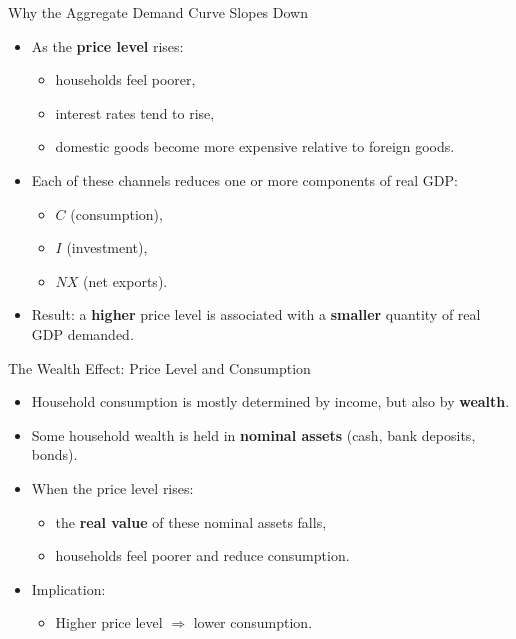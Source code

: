 \documentclass[aspectratio=169]{beamer}
\begin{document}

\begin{frame}{Why the Aggregate Demand Curve Slopes Down}
\transfade
\begin{itemize}[<+->]
  \item As the \textbf{price level} rises:
  \begin{itemize}[<+->]
    \item households feel poorer,
    \item interest rates tend to rise,
    \item domestic goods become more expensive relative to foreign goods.
  \end{itemize}
  \item Each of these channels reduces one or more components of real GDP:
  \begin{itemize}[<+->]
    \item \(C\) (consumption),
    \item \(I\) (investment),
    \item \(NX\) (net exports).
  \end{itemize}
  \item Result: a \textbf{higher} price level is associated with a \textbf{smaller} quantity of real GDP demanded.
\end{itemize}
\end{frame}

\begin{frame}{The Wealth Effect: Price Level and Consumption}
\transfade
\begin{itemize}[<+->]
  \item Household consumption is mostly determined by income, but also by \textbf{wealth}.
  \item Some household wealth is held in \textbf{nominal assets} (cash, bank deposits, bonds).
  \item When the price level rises:
  \begin{itemize}[<+->]
    \item the \textbf{real value} of these nominal assets falls,
    \item households feel poorer and reduce consumption.
  \end{itemize}
  \item Implication:
  \begin{itemize}[<+->]
    \item \alert{Higher price level} \(\Rightarrow\) \alert{lower consumption}.
  \end{itemize}
\end{itemize}
\end{frame}
\end{document}
